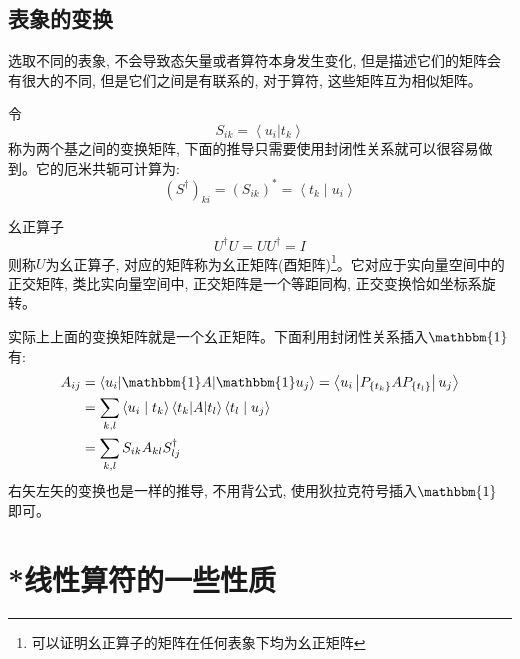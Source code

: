 \subsection*{表象的变换}
选取不同的表象, 不会导致态矢量或者算符本身发生变化, 但是描述它们的矩阵会有很大的不同, 但是它们之间是有联系的, 对于算符, 这些矩阵互为相似矩阵。

令$$S_{ik}=\left\langle u_i  | t_k  \right\rangle$$称为两个基之间的变换矩阵, 下面的推导只需要使用封闭性关系就可以很容易做到。它的厄米共轭可计算为:
$$
\left(S^{\dagger}\right)_{k i}=\left(S_{i k}\right)^{*}=\left\langle t_{k} \mid u_{i}\right\rangle
$$
\begin{define}{幺正算子}
    \begin{equation}
        \boxed{U^\dagger U=U U^\dagger=I}
    \end{equation}
    则称$U$为幺正算子, 对应的矩阵称为幺正矩阵(酉矩阵)\footnote[1]{可以证明幺正算子的矩阵在任何表象下均为幺正矩阵}。它对应于实向量空间中的正交矩阵, 类比实向量空间中, 正交矩阵是一个等距同构, 正交变换恰如坐标系旋转。
\end{define}
实际上上面的变换矩阵就是一个幺正矩阵。下面利用封闭性关系插入$\mathbbm{1}$有:
\begin{equation*}
   \begin{aligned}
    A_{i j} &=\left\langle u_{i}|\mathbbm{1}A|\mathbbm{1}u_{j}\right\rangle=\left\langle u_{i}\left|P_{\left\{t_{k}\right\}} A P_{\left\{t_{l}\right\}}\right| u_{j}\right\rangle \\
    &=\sum_{k, l}\left\langle u_{i} \mid t_{k}\right\rangle\left\langle t_{k}|A| t_{l}\right\rangle\left\langle t_{l} \mid u_{j}\right\rangle \\
    &=\sum_{k, l} S_{i k} A_{k l} S_{l j}^{\dagger}
    \end{aligned} 
\end{equation*}
右矢左矢的变换也是一样的推导, 不用背公式, 使用狄拉克符号插入$\mathbbm{1}$即可。
\section{*线性算符的一些性质}
